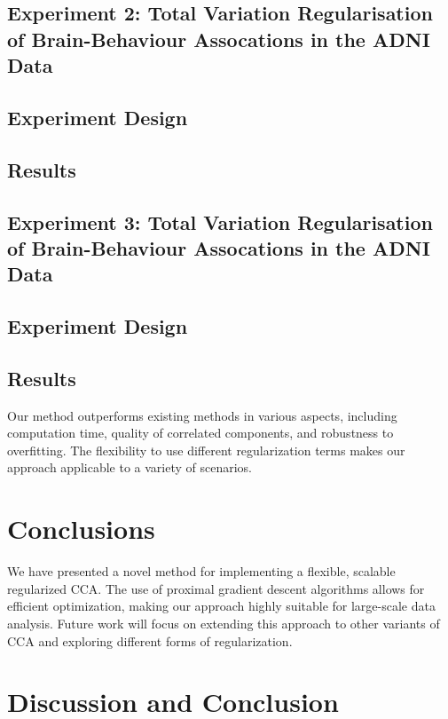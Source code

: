 \subsection{Experiment 2: Total Variation Regularisation of Brain-Behaviour Assocations in the ADNI Data}
\subsection{Experiment Design}
\subsection{Results}

\subsection{Experiment 3: Total Variation Regularisation of Brain-Behaviour Assocations in the ADNI Data}
\subsection{Experiment Design}

\subsection{Results}
Our method outperforms existing methods in various aspects, including computation time, quality of correlated components, and robustness to overfitting.
The flexibility to use different regularization terms makes our approach applicable to a variety of scenarios.

\section{Conclusions}
We have presented a novel method for implementing a flexible, scalable regularized CCA. The use of proximal gradient descent algorithms allows for efficient optimization, making our approach highly suitable for large-scale data analysis.
Future work will focus on extending this approach to other variants of CCA and exploring different forms of regularization.

\section{Discussion and Conclusion}


